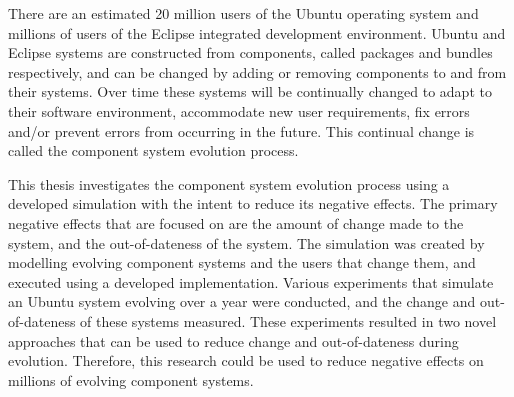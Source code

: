 There are an estimated 20 million users of the Ubuntu operating system and millions of users of the Eclipse integrated development environment.
Ubuntu and Eclipse systems are constructed from components, called packages and bundles respectively, 
and can be changed by adding or removing components to and from their systems. 
Over time these systems will be continually changed to adapt to their software environment, accommodate new user requirements, 
fix errors and/or prevent errors from occurring in the future.
This continual change is called the component system evolution process.

This thesis investigates the component system evolution process using a developed simulation with the intent to reduce its negative effects.
The primary negative effects that are focused on are the amount of change made to the system,
and the out-of-dateness of the system. 
The simulation was created by modelling evolving component systems and the users that change them,
and executed using a developed implementation.
Various experiments that simulate an Ubuntu system evolving over a year were conducted, and the change and out-of-dateness of these systems measured.
These experiments resulted in two novel approaches that can be used to reduce change and out-of-dateness during evolution.
Therefore, this research could be used to reduce negative effects on millions of evolving component systems. 


